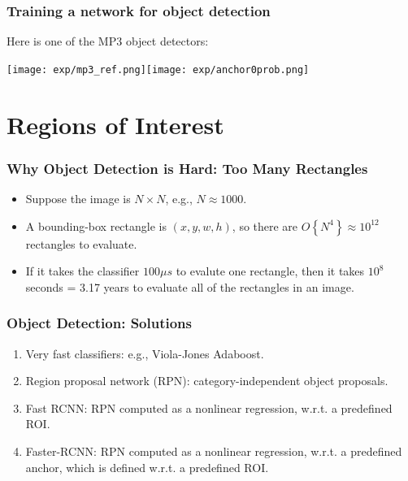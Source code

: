 \documentclass{beamer}
\begin{document}
\begin{frame}
  \frametitle{Training a network for object detection}
  
  Here is one of the MP3 object detectors:
  
  \centerline{\texttt{[image: exp/mp3\_ref.png]}\texttt{[image: exp/anchor0prob.png]}}
  
\end{frame}


\section[ROI]{Regions of Interest}
\setcounter{subsection}{1}

\begin{frame}
  \frametitle{Why Object Detection is Hard: Too Many Rectangles}
  \begin{itemize}
  \item Suppose the image is $N\times N$, e.g., $N\approx 1000$.
  \item A bounding-box rectangle is $(x,y,w,h)$, so there are
    $O\left\{N^4\right\}\approx 10^{12}$ rectangles to evaluate.
  \item If it takes the classifier $100\mu s$ to evalute one
    rectangle, then it takes $10^8$ seconds = 3.17 years to evaluate
    all of the rectangles in an image.
  \end{itemize}
\end{frame}

\begin{frame}
  \frametitle{Object Detection: Solutions}
  \begin{enumerate}
  \item Very fast classifiers: e.g., Viola-Jones Adaboost.
  \item Region proposal network (RPN): category-independent object
    proposals.
  \item Fast RCNN: RPN computed as a nonlinear regression, w.r.t. a
    predefined ROI.
  \item Faster-RCNN: RPN computed as a nonlinear regression, w.r.t. a
    predefined anchor, which is defined w.r.t. a predefined ROI.
  \end{enumerate}
\end{frame}
\end{document}
